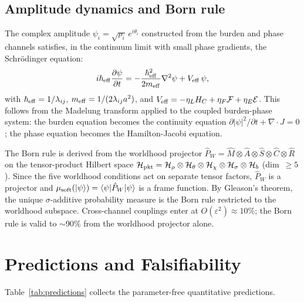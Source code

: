 \documentclass[11pt,twocolumn]{article}
\begin{document}
\subsection{Amplitude dynamics and Born rule}
\label{sec:born}

The complex amplitude $\psi_i = \sqrt{\rho_i}\,e^{i\theta_i}$ constructed from the burden and phase channels satisfies, in the continuum limit with small phase gradients, the Schr\"odinger equation:
\begin{equation}
\label{eq:schrodinger}
i\hbar_{\rm eff}\frac{\partial\psi}{\partial t} = -\frac{\hbar_{\rm eff}^2}{2m_{\rm eff}}\nabla^2\psi + V_{\rm eff}\,\psi,
\end{equation}
with $\hbar_{\rm eff} = 1/\lambda_{ij}$, $m_{\rm eff} = 1/(2\lambda_{ij}a^2)$, and $V_{\rm eff} = -\eta_L H_C + \eta_F\mathcal{F} + \eta_E\mathcal{E}$.
This follows from the Madelung transform applied to the coupled burden-phase system: the burden equation becomes the continuity equation $\partial|\psi|^2/\partial t + \nabla\cdot J = 0$; the phase equation becomes the Hamilton-Jacobi equation.

The Born rule is derived from the worldhood projector $\hat{P}_W = \hat{M}\otimes\hat{A}\otimes\hat{S}\otimes\hat{C}\otimes\hat{R}$ on the tensor-product Hilbert space $\mathcal{H}_{\rm pkt} = \mathcal{H}_\rho\otimes\mathcal{H}_\theta\otimes\mathcal{H}_\chi\otimes\mathcal{H}_\sigma\otimes\mathcal{H}_b$ (dim~$\geq 5$).
Since the five worldhood conditions act on separate tensor factors, $\hat{P}_W$ is a projector and $\mu_{\rm soft}(|\psi\rangle) = \langle\psi|\hat{P}_W|\psi\rangle$ is a frame function.
By Gleason's theorem,\cite{gleason} the unique $\sigma$-additive probability measure is the Born rule restricted to the worldhood subspace.
Cross-channel couplings enter at $O(\varepsilon^2) \approx 10\%$; the Born rule is valid to $\sim$90\% from the worldhood projector alone.


\section{Predictions and Falsifiability}
\label{sec:predictions}

Table~\ref{tab:predictions} collects the parameter-free quantitative predictions.
\end{document}
